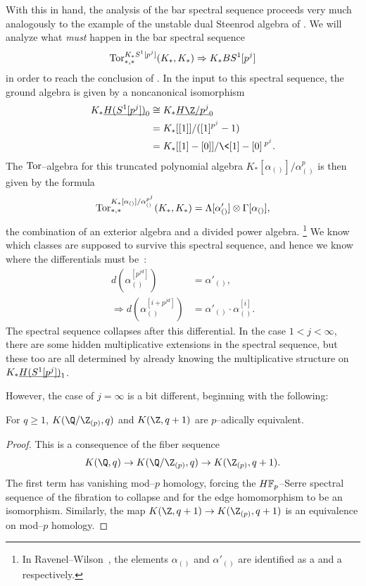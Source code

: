 With this in hand, the analysis of the bar spectral sequence proceeds very much analogously to the example of the unstable dual Steenrod algebra of .
We will analyze what \emph{must} happen in the bar spectral sequence \[\operatorname{Tor}^{K_* S^1[p^j]}_{*, *}(K_*, K_*) \Rightarrow K_* BS^1[p^j]\] in order to reach the conclusion of .
In the input to this spectral sequence, the ground algebra is given by a noncanonical isomorphism
\begin{align*}
K_* \OS{H(S^1[p^j])}{0} 
& \cong K_* \OS{H\Z/p^j}{0} \\
& = K_*[[1]] / ([1]^{p^j} - 1) \\
& = K_*[[1] - [0]] / \<[1] - [0]\>^{p^j}.
\end{align*}
The \(\operatorname{Tor}\)--algebra for this truncated polynomial algebra \(K_*[\alpha_{()}] / \alpha_{()}^{p}\) is then given by the formula \[\operatorname{Tor}^{K_*[\alpha_{()}] / \alpha_{()}^{p^j}}_{*, *}(K_*, K_*) = \Lambda[\alpha'_{()}] \otimes \Gamma[\alpha_{()}],\] the combination of an exterior algebra and a divided power algebra.%
\footnote{%
In Ravenel--Wilson~\cite[Lemma 6.6]{RavenelWilsonKthyOfEMSpaces}, the elements \(\alpha_{()}\) and \(\alpha'_{()}\) are identified as a  and a  respectively.
}
We know which classes are supposed to survive this spectral sequence, and hence we know where the differentials must be~\cite[Section 8]{RavenelWilsonKthyOfEMSpaces}:
\begin{align*}
d\left(\alpha_{()}^{[p^{jd}]}\right) & = \alpha'_{()}, \\
\Rightarrow d\left(\alpha_{()}^{[i + p^{jd}]}\right) & = \alpha'_{()} \cdot \alpha_{()}^{[i]}.
\end{align*}
The spectral sequence collapses after this differential.
In the case \(1 < j < \infty\), there are some hidden multiplicative extensions in the spectral sequence, but these too are all determined by already knowing the multiplicative structure on \(K_* \OS{H(S^1[p^j])}{1}\).

However, the case of \(j = \infty\) is a bit different, beginning with the following:

\begin{lemma}
For \(q \ge 1\), \(K(\Q/\Z_{(p)}, q)\) and \(K(\Z, q+1)\) are \(p\)--adically equivalent.
\end{lemma}
\begin{proof}
This is a consequence of the fiber sequence \[K(\Q, q) \to K(\Q/\Z_{(p)}, q) \to K(\Z_{(p)}, q+1).\]
The first term has vanishing mod--\(p\) homology, forcing the \(\HFp\)--Serre spectral sequence of the fibration to collapse and for the edge homomorphism to be an isomorphism.
Similarly, the map \(K(\Z, q+1) \to K(\Z_{(p)}, q+1)\) is an equivalence on mod--\(p\) homology.
\end{proof}

